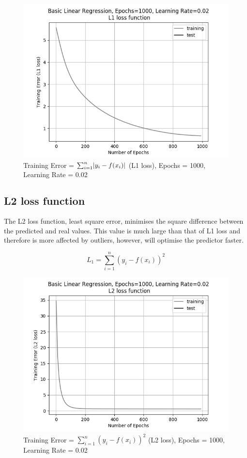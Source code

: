 \documentclass[10pt,twocolumn,letterpaper]{article}
\DeclarePairedDelimiter\abs{\lvert}{\rvert}%
\begin{document}
\begin{figure}[h]
	\begin{center}
		\includegraphics[width=0.9\linewidth]{img/l1loss.png}
	\end{center}
	\caption{Training Error = $\sum_{i = 1}^{n} \abs{y_i - f(x_i)}$ (L1 loss), Epochs = 1000, Learning Rate = 0.02}
	\label{fig:l1loss}
\end{figure}

\subsection{L2 loss function}
The L2 loss function, least square error, minimises the square difference between the predicted and real values. This value is much large than that of L1 loss and therefore is more affected by outliers, however, will optimise the predictor faster.

\begin{equation}
L_1 = \sum_{i = 1}^{n} (y_i - f(x_i))^2
\end{equation}

\begin{figure}[h]
	\begin{center}
		\includegraphics[width=0.9\linewidth]{img/l2loss.png}
	\end{center}
	\caption{Training Error = $\sum_{i = 1}^{n} (y_i - f(x_i))^2$ (L2 loss), Epochs = 1000, Learning Rate = 0.02}
	\label{fig:l2loss}
\end{figure}
\end{document}
